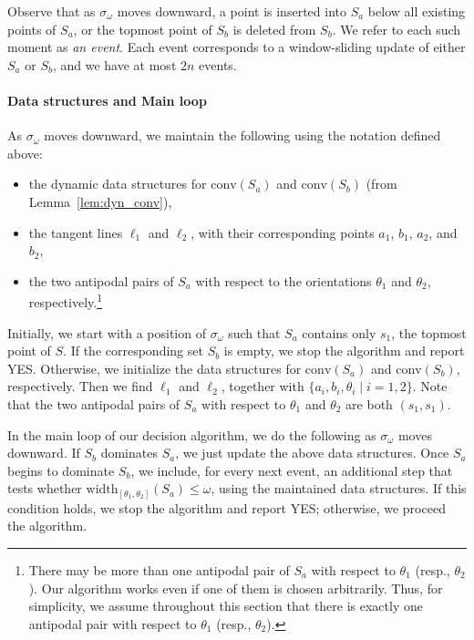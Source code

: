 \documentclass[10pt,a4paper]{article}
\theoremstyle{star}
\theoremstyle{claimstar}
\newcommand{\width}{\ensuremath{\mathrm{width}}}
\newcommand{\conv}{\ensuremath{\mathrm{conv}}}
\begin{document}
Observe that as $\sigma_\omega$ moves downward, a point is inserted into $S_a$ below all existing points of $S_a$, or the topmost point of $S_b$ is deleted from $S_b$. 
We refer to each such moment as \emph{an event}. 
Each event corresponds to a window-sliding update of either $S_a$ or $S_b$, and we have at most $2n$ events.  

\paragraph*{Data structures and Main loop}
\label{par:ds_mainloop}
As $\sigma_\omega$ moves downward, we maintain the following using the notation defined above:
\begin{itemize}
    \item the dynamic data structures for $\conv(S_a)$ and $\conv(S_b)$ (from Lemma~\ref{lem:dyn_conv}),
    \item the tangent lines $\ell_1$ and $\ell_2$, with their corresponding points $a_1$, $b_1$, $a_2$, and $b_2$,
    \item the two antipodal pairs of $S_a$ with respect to the orientations $\theta_1$ and $\theta_2$, respectively.\footnote{There may be more than one antipodal pair of $S_a$ with respect to $\theta_1$ (resp., $\theta_2$). 
    Our algorithm works even if one of them is chosen arbitrarily. 
    Thus, for simplicity, we assume throughout this section that there is exactly one antipodal pair with respect to $\theta_1$ (resp., $\theta_2$).}
\end{itemize}

Initially, we start with a position of $\sigma_\omega$ such that $S_a$ contains only $s_1$, the topmost point of $S$. 
If the corresponding set $S_b$ is empty, we stop the algorithm and report YES. Otherwise, we initialize the data structures for $\conv(S_a)$ and $\conv(S_b)$, respectively.
Then we find $\ell_1$ and $\ell_2$, together with $\{a_i, b_i, \theta_i \mid i = 1, 2\}$. 
Note that the two antipodal pairs of $S_a$ with respect to $\theta_1$ and $\theta_2$ are both $(s_1, s_1)$.


In the main loop of our decision algorithm, we do the following as $\sigma_\omega$ moves downward.
If $S_b$ dominates $S_a$, we just update the above data structures.  
Once $S_a$ begins to dominate $S_b$, we include, for every next event, an additional step that tests whether $\width_{[\theta_1, \theta_2]}(S_a) \le \omega$, using the maintained data structures. If this condition holds, we stop the algorithm and report YES; otherwise, we proceed the algorithm. 
\end{document}
